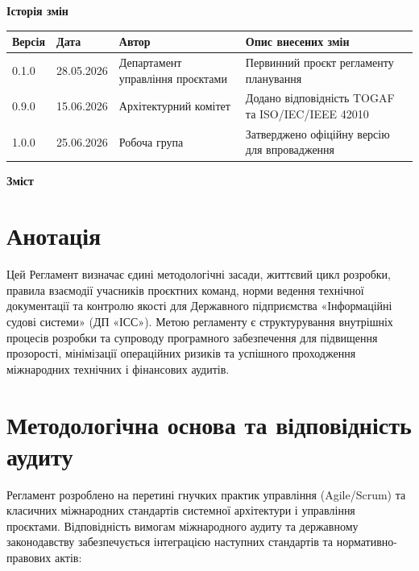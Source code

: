 \documentclass{article}
\begin{document}
\vspace{20pt}
\begin{center}
  {\large\color{nato}\bfseries Історія змін\par}
\end{center}
\vspace{10pt}
\begin{longtable}{@{}p{1.5cm}p{2.0cm}p{3.0cm}p{7.0cm}@{}}
\toprule
\textbf{Версія} & \textbf{Дата} & \textbf{Автор} & \textbf{Опис внесених змін} \\
\midrule
0.1.0 & 28.05.2026 & Департамент управління проєктами & Первинний проєкт регламенту планування \\
0.9.0 & 15.06.2026 & Архітектурний комітет & Додано відповідність TOGAF та ISO/IEC/IEEE 42010 \\
1.0.0 & 25.06.2026 & Робоча група & Затверджено офіційну версію для впровадження \\
\bottomrule
\end{longtable}

\newpage
\begin{center}
  {\Huge\color{nato}\bfseries Зміст\par}
\end{center}
\vspace{40pt}
\tableofcontents

\newpage

\section*{Анотація}
Цей Регламент визначає єдині методологічні засади, життєвий цикл розробки, правила взаємодії учасників проєктних команд, норми ведення технічної документації та контролю якості для Державного підприємства «Інформаційні судові системи» (ДП «ІСС»). Метою регламенту є структурування внутрішніх процесів розробки та супроводу програмного забезпечення для підвищення прозорості, мінімізації операційних ризиків та успішного проходження міжнародних технічних і фінансових аудитів.

\section*{Методологічна основа та відповідність аудиту}
Регламент розроблено на перетині гнучких практик управління (Agile/Scrum) та класичних міжнародних стандартів системної архітектури і управління проєктами. Відповідність вимогам міжнародного аудиту та державному законодавству забезпечується інтеграцією наступних стандартів та нормативно-правових актів:
\end{document}
